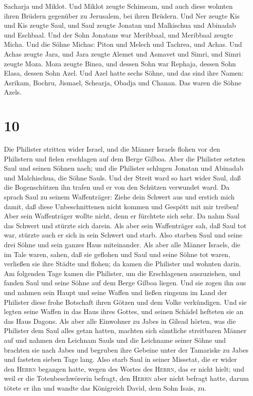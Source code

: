 Sacharja und Miklot.  Und Miklot zeugte Schimeam, und
auch diese wohnten ihren Brüdern gegenüber zu Jerusalem, bei ihren
Brüdern.  Und Ner zeugte Kis und Kis zeugte Saul, und
Saul zeugte Jonatan und Malkischua und Abinadab und Eschbaal.
 Und der Sohn Jonatans war Meribbaal, und Meribbaal
zeugte Micha.  Und die Söhne Michas: Piton und Melech und
Tachrea, und Achas.  Und Achas zeugte Jara, und Jara
zeugte Alemet und Asmavet und Simri, und Simri zeugte Moza.
 Moza zeugte Binea, und dessen Sohn war Rephaja, dessen
Sohn Elasa, dessen Sohn Azel.  Und Azel hatte sechs
Söhne, und das sind ihre Namen: Asrikam, Bochru, Jismael, Schearja,
Obadja und Chanan. Das waren die Söhne Azels.

\hypertarget{section-9}{%
\section{10}\label{section-9}}

 Die Philister stritten wider Israel, und die Männer
Israels flohen vor den Philistern und fielen erschlagen auf dem Berge
Gilboa.  Aber die Philister setzten Saul und seinen Söhnen
nach; und die Philister schlugen Jonatan und Abinadab und Malchischua,
die Söhne Sauls.  Und der Streit ward so hart wider Saul,
daß die Bogenschützen ihn trafen und er von den Schützen verwundet ward.
 Da sprach Saul zu seinem Waffenträger: Ziehe dein Schwert
aus und erstich mich damit, daß diese Unbeschnittenen nicht kommen und
Gespött mit mir treiben! Aber sein Waffenträger wollte nicht, denn er
fürchtete sich sehr. Da nahm Saul das Schwert und stürzte sich darein.
 Als aber sein Waffenträger sah, daß Saul tot war, stürzte
auch er sich in sein Schwert und starb.  Also starben Saul
und seine drei Söhne und sein ganzes Haus miteinander. 
Als aber alle Männer Israels, die im Tale waren, sahen, daß sie geflohen
und Saul und seine Söhne tot waren, verließen sie ihre Städte und
flohen; da kamen die Philister und wohnten darin.  Am
folgenden Tage kamen die Philister, um die Erschlagenen auszuziehen, und
fanden Saul und seine Söhne auf dem Berge Gilboa liegen. 
Und sie zogen ihn aus und nahmen sein Haupt und seine Waffen und ließen
ringsum im Land der Philister diese frohe Botschaft ihren Götzen und dem
Volke verkündigen.  Und sie legten seine Waffen in das
Haus ihres Gottes, und seinen Schädel hefteten sie an das Haus Dagons.
 Als aber alle Einwohner zu Jabes in Gilead hörten, was
die Philister dem Saul alles getan hatten,  machten sich
sämtliche streitbaren Männer auf und nahmen den Leichnam Sauls und die
Leichname seiner Söhne und brachten sie nach Jabes und begruben ihre
Gebeine unter der Tamariske zu Jabes und fasteten sieben Tage lang.
 Also starb Saul in seiner Missetat, die er wider den
\textsc{Herrn} begangen hatte, wegen des Wortes des \textsc{Herrn}, das
er nicht hielt; und weil er die Totenbeschwörerin befragt,
 den \textsc{Herrn} aber nicht befragt hatte, darum
tötete er ihn und wandte das Königreich David, dem Sohn Isais, zu.


